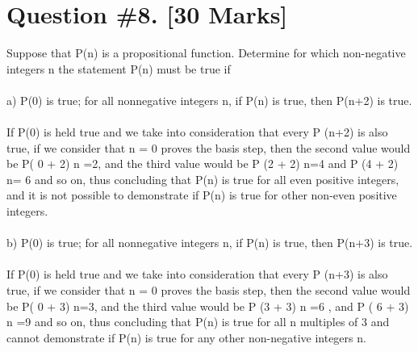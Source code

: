 \documentclass{article}
\begin{document}
\section{Question \#8. [30 Marks]}
Suppose that P(n) is a propositional function. Determine for which non-negative integers n the statement P(n) must be true if  \\ \\ a) P(0) is true; for all nonnegative integers n, if P(n) is true, then P(n+2) is true. \\\\
If P(0) is held true and we take into consideration that every P (n+2) is also true, if we consider that n = 0 proves the basis step, then the second value would be P( 0 + 2) n =2, and the third value would be P (2 + 2) n=4 and P (4 + 2) n= 6 and so on, thus concluding that P(n) is true for all even positive integers, and it is not possible to demonstrate if P(n) is true for other non-even positive integers.  \\\\
b) P(0) is true; for all nonnegative integers n, if P(n) is true, then P(n+3) is true. \\ \\
If P(0) is held true and we take into consideration that every P (n+3) is also true, if we consider that n = 0 proves the basis step, then the second value would be P( 0 + 3) n=3, and the third value would be P (3 + 3) n =6 , and P ( 6 + 3) n =9 and so on, thus concluding that P(n) is true for all n multiples of 3 and cannot demonstrate if P(n) is true for any other non-negative integers n. 
\newpage
\end{document}
